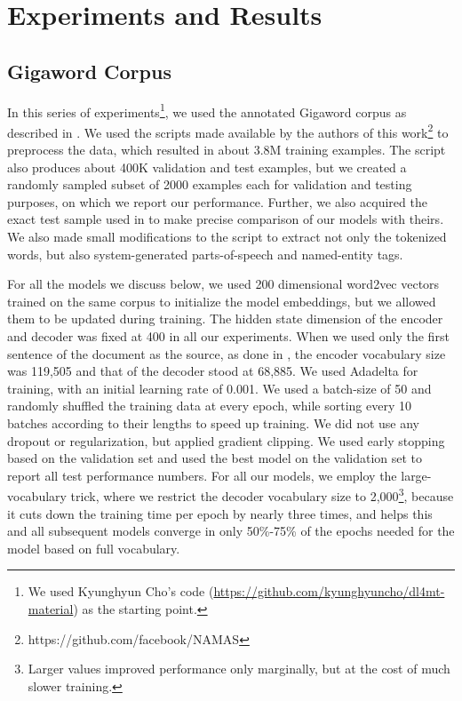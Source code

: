 \documentclass[11pt]{article}
\begin{document}
 \section{Experiments and Results}\label{sec:exp}

\subsection{Gigaword Corpus}

In this series of experiments\footnote{We used Kyunghyun Cho's code (\url{https://github.com/kyunghyuncho/dl4mt-material}) as the starting point.}, we used the annotated Gigaword corpus as described in . We used the scripts made available by the authors of this work\footnote{https://github.com/facebook/NAMAS} to preprocess the data, which resulted in about 3.8M training examples. The script also produces about 400K validation and test examples, but we created a randomly sampled subset of 2000 examples each for validation and testing purposes, on which we report our performance. Further, we also acquired the exact test sample used in  to make precise comparison of our models with theirs.
We also made small modifications to the script to extract not only the tokenized words, but also system-generated parts-of-speech and named-entity tags. 

 For all the models we discuss below, we used 200 dimensional word2vec vectors \cite{word2vec} trained on the same corpus to initialize the model embeddings, but we allowed them to be updated during training. 
The hidden state dimension of the encoder and decoder was fixed at 400 in all our experiments. 
When we used only the first sentence of the document as the source, as done in , the encoder vocabulary size was 119,505 and that of the decoder stood at 68,885. We used Adadelta \cite{adadelta} for training, with an initial learning rate of 0.001. We used a batch-size of 50 and randomly shuffled the training data at every epoch, while sorting every 10 batches according to their lengths to speed up training. We did not use any dropout or regularization, but applied gradient clipping. We used early stopping based on the validation set and used the best model on the validation set to report all test performance numbers. For all our models, we employ the large-vocabulary trick, where we restrict the decoder vocabulary size to 2,000\footnote{Larger values improved performance only marginally, but at the cost of much slower training.}, because it cuts down the training time per epoch by nearly three times, and helps this and all subsequent models converge in only 50\%-75\% of the epochs needed for the model based on full vocabulary.
\end{document}

